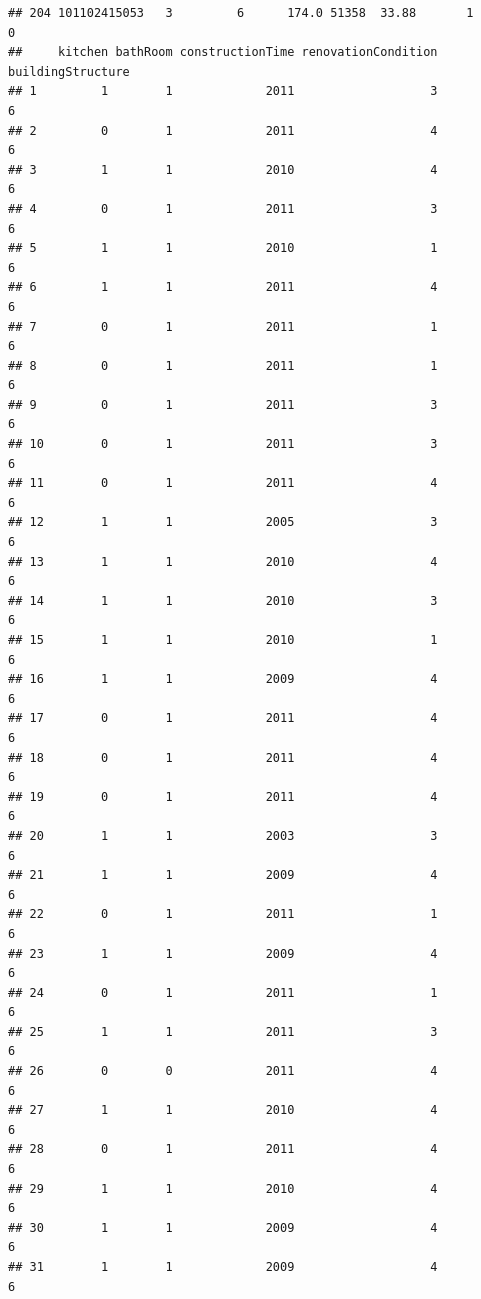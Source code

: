 \documentclass[
]{article}
\begin{document}
\begin{verbatim}
## 204 101102415053   3         6      174.0 51358  33.88       1          0
##     kitchen bathRoom constructionTime renovationCondition buildingStructure
## 1         1        1             2011                   3                 6
## 2         0        1             2011                   4                 6
## 3         1        1             2010                   4                 6
## 4         0        1             2011                   3                 6
## 5         1        1             2010                   1                 6
## 6         1        1             2011                   4                 6
## 7         0        1             2011                   1                 6
## 8         0        1             2011                   1                 6
## 9         0        1             2011                   3                 6
## 10        0        1             2011                   3                 6
## 11        0        1             2011                   4                 6
## 12        1        1             2005                   3                 6
## 13        1        1             2010                   4                 6
## 14        1        1             2010                   3                 6
## 15        1        1             2010                   1                 6
## 16        1        1             2009                   4                 6
## 17        0        1             2011                   4                 6
## 18        0        1             2011                   4                 6
## 19        0        1             2011                   4                 6
## 20        1        1             2003                   3                 6
## 21        1        1             2009                   4                 6
## 22        0        1             2011                   1                 6
## 23        1        1             2009                   4                 6
## 24        0        1             2011                   1                 6
## 25        1        1             2011                   3                 6
## 26        0        0             2011                   4                 6
## 27        1        1             2010                   4                 6
## 28        0        1             2011                   4                 6
## 29        1        1             2010                   4                 6
## 30        1        1             2009                   4                 6
## 31        1        1             2009                   4                 6

\end{verbatim}
\end{document}
